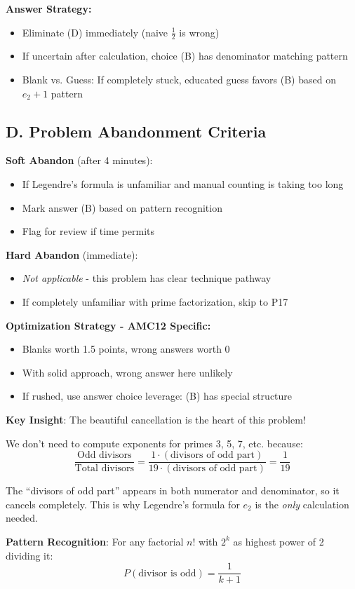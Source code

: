\documentclass[]{article}
\begin{document}
\begin{competitionbox}
\textbf{Answer Strategy:}
\begin{itemize}[leftmargin=*]
    \item Eliminate (D) immediately (naive $\frac{1}{2}$ is wrong)
    \item If uncertain after calculation, choice (B) has denominator matching pattern
    \item Blank vs. Guess: If completely stuck, educated guess favors (B) based on $e_2 + 1$ pattern
\end{itemize}

\subsection*{D. Problem Abandonment Criteria}

\textbf{Soft Abandon} (after 4 minutes):
\begin{itemize}[leftmargin=*]
    \item If Legendre's formula is unfamiliar and manual counting is taking too long
    \item Mark answer (B) based on pattern recognition
    \item Flag for review if time permits
\end{itemize}

\textbf{Hard Abandon} (immediate):
\begin{itemize}[leftmargin=*]
    \item \textit{Not applicable} - this problem has clear technique pathway
    \item If completely unfamiliar with prime factorization, skip to P17
\end{itemize}

\textbf{Optimization Strategy - AMC12 Specific:}
\begin{itemize}[leftmargin=*]
    \item Blanks worth 1.5 points, wrong answers worth 0
    \item With solid approach, wrong answer here unlikely
    \item If rushed, use answer choice leverage: (B) has special structure
\end{itemize}
\end{competitionbox}

\begin{keyinsightbox}
\textbf{Key Insight}: The beautiful cancellation is the heart of this problem! 

We don't need to compute exponents for primes 3, 5, 7, etc. because:
\[\frac{\text{Odd divisors}}{\text{Total divisors}} = \frac{1 \cdot (\text{divisors of odd part})}{19 \cdot (\text{divisors of odd part})} = \frac{1}{19}\]

The ``divisors of odd part'' appears in both numerator and denominator, so it cancels completely. This is why Legendre's formula for $e_2$ is the \textit{only} calculation needed.

\textbf{Pattern Recognition}: For any factorial $n!$ with $2^k$ as highest power of 2 dividing it:
\[P(\text{divisor is odd}) = \frac{1}{k+1}\]
\end{keyinsightbox}
\end{document}
